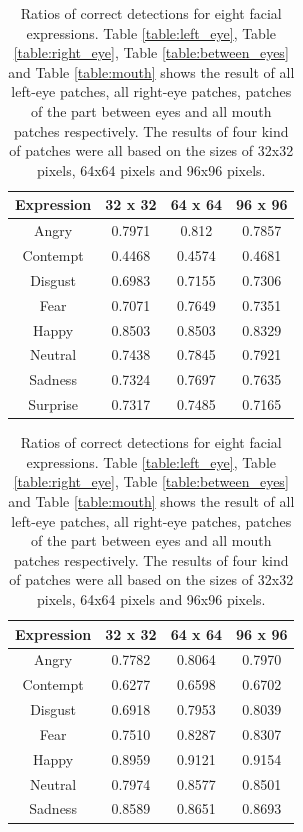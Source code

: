 \begin{table}
    \begin{subtable}[b]{3in}
    \centering
    \begin{tabular}{| c | c | c | c |}
    \hline
    Expression & 32 x 32 &  64 x 64  & 96 x 96  \\
    \hline
    Angry & 0.7971 & 0.812 & 0.7857 \\
    Contempt & 0.4468 & 0.4574 & 0.4681 \\
    Disgust & 0.6983 & 0.7155 & 0.7306 \\
    Fear & 0.7071 & 0.7649 & 0.7351 \\
    Happy & 0.8503 & 0.8503 & 0.8329 \\
    Neutral & 0.7438 & 0.7845 & 0.7921 \\
    Sadness & 0.7324 & 0.7697 & 0.7635 \\
    Surprise & 0.7317 & 0.7485 & 0.7165 \\
    \hline
    \end{tabular}
    \caption{Right eye patches}
    \label{table:between_eyes}
    \end{subtable}
\quad


    \begin{subtable}[b]{3in}
    \centering
    \begin{tabular}{| c | c | c | c |}
    \hline
    Expression & 32 x 32 &  64 x 64  & 96 x 96  \\
    \hline
    Angry	&	0.7782	&	0.8064	&	0.7970	\\
    Contempt	&	0.6277	&	0.6598	& 0.6702 \\
    Disgust	&	0.6918	&	0.7953	&	0.8039	\\
    Fear	&	0.7510	&	0.8287	&	0.8307	\\
    Happy	&	0.8959	&	0.9121	&	0.9154	\\
    Neutral	&	0.7974	&	0.8577	&	0.8501	\\
    Sadness	&	0.8589	&	0.8651	&	0.8693	\\
    \hline
    \end{tabular}
    \caption{Mouth patches}
    \label{table:mouth}
    \end{subtable}

\label{table:results of patches}
\caption[Ratios of correct detections for eight facial expressions]{Ratios of correct detections for eight facial expressions. Table \ref{table:left_eye}, Table \ref{table:right_eye}, Table \ref{table:between_eyes} and Table \ref{table:mouth} shows the result of all left-eye patches, all right-eye patches, patches of the part between eyes and all mouth patches respectively. The results of four kind of patches were all based on the sizes of 32x32 pixels, 64x64 pixels and 96x96 pixels.}
\end{table}

